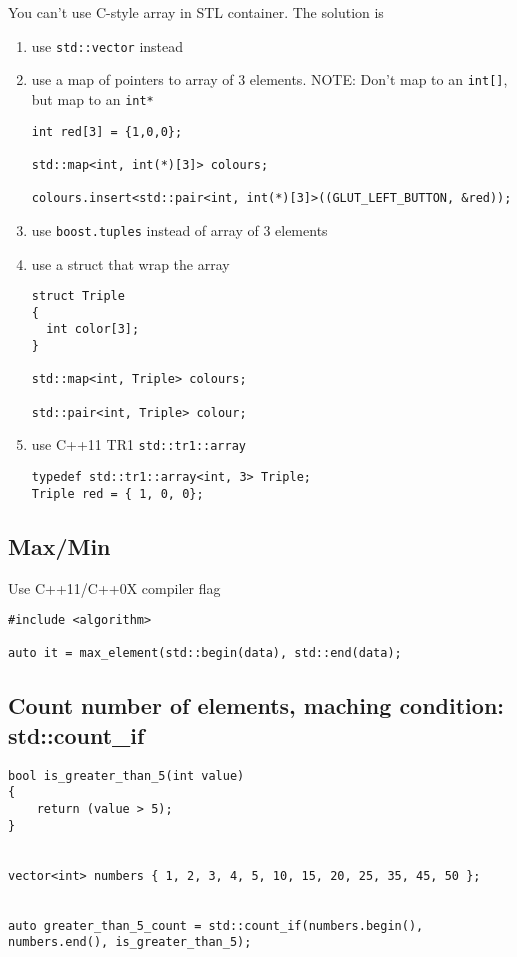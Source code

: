 You can't use C-style array in STL container. The solution is
\begin{enumerate}
  \item use \verb!std::vector! instead
  \item use a map of pointers to array of 3 elements. NOTE: Don't map to an
  \verb!int[]!, but map to an \verb!int*!
\begin{verbatim}
int red[3] = {1,0,0};

std::map<int, int(*)[3]> colours;

colours.insert<std::pair<int, int(*)[3]>((GLUT_LEFT_BUTTON, &red));
\end{verbatim}

  \item use \verb!boost.tuples! instead of array of 3 elements 
  \item use a struct that wrap the array
\begin{verbatim}
struct Triple
{
  int color[3];
}

std::map<int, Triple> colours;

std::pair<int, Triple> colour;
\end{verbatim}
  
     \item use C++11 TR1 \verb!std::tr1::array!
\begin{verbatim}
typedef std::tr1::array<int, 3> Triple;
Triple red = { 1, 0, 0};

\end{verbatim}
\end{enumerate}


\subsection{Max/Min}

Use C++11/C++0X compiler flag
\begin{verbatim}
#include <algorithm>

auto it = max_element(std::begin(data), std::end(data);
\end{verbatim}

\subsection{Count number of elements, maching condition: std::count\_if}



\begin{verbatim}
bool is_greater_than_5(int value)
{
    return (value > 5);
}
 
 
vector<int> numbers { 1, 2, 3, 4, 5, 10, 15, 20, 25, 35, 45, 50 };


auto greater_than_5_count = std::count_if(numbers.begin(), numbers.end(), is_greater_than_5);
\end{verbatim}

